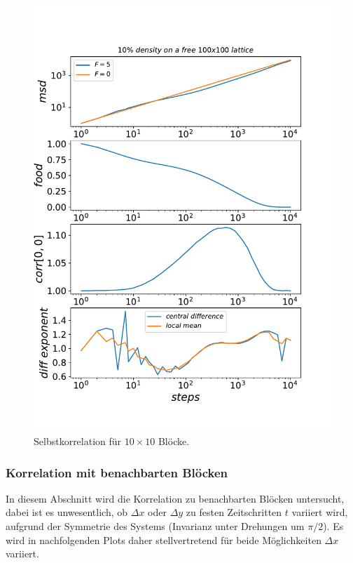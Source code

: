 \documentclass[a4paper, 12pt]{scrartcl}
\begin{document}
\begin{figure}[h!]
	\centering
	\includegraphics[scale=0.8]{corr1.pdf}
	\caption{Selbstkorrelation für $10\times 10$ Blöcke.}
\end{figure}

\newpage

\subsubsection{Korrelation mit benachbarten Blöcken}

In diesem Abschnitt wird die Korrelation zu benachbarten Blöcken untersucht, dabei ist es unwesentlich, ob $\Delta x$ oder $\Delta y$ zu festen Zeitschritten $t$ variiert wird, aufgrund der Symmetrie des Systems (Invarianz unter Drehungen um $\pi/2$). Es wird in nachfolgenden Plots daher stellvertretend für beide Möglichkeiten $\Delta x$ variiert.
\end{document}
